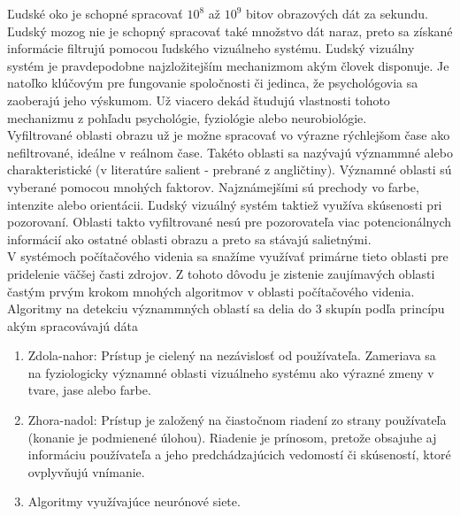 
Ľudské oko je schopné spracovať \begin{math}10^8\end{math} až \begin{math}10^9\end{math} bitov obrazových dát za sekundu.
Ľudský mozog nie je schopný spracovať také množstvo dát naraz, preto sa získané informácie filtrujú pomocou ľudského vizuálneho systému\cite{Fmph-videnie}.
Ľudský vizuálny systém je pravdepodobne najzložitejším mechanizmom akým človek disponuje.
Je natoľko klúčovým pre fungovanie spoločnosti či jedinca, že psychológovia sa zaoberajú jeho výskumom.
Už viacero dekád študujú vlastnosti tohoto mechanizmu z pohľadu psychológie, fyziológie alebo neurobiológie.
\\
Vyfiltrované oblasti obrazu už je možne spracovať vo výrazne rýchlejšom čase ako nefiltrované, ideálne v reálnom čase.
Takéto oblasti sa nazývajú význammné alebo charakteristické (v literatúre salient - prebrané z angličtiny).
Významné oblasti sú vyberané pomocou mnohých faktorov.
Najznámejšími sú prechody vo farbe, intenzite alebo orientácii.
Ľudský vizuálný systém taktiež využíva skúsenosti pri pozorovaní.
Oblasti takto vyfiltrované nesú pre pozorovateľa viac potencionálnych informácií ako ostatné oblasti obrazu a preto sa stávajú salietnými.
\\
V systémoch počítačového videnia sa snažíme využívať primárne tieto oblasti pre pridelenie väčšej časti zdrojov.
Z tohoto dôvodu je zistenie zaujímavých oblasti častým prvým krokom mnohých algoritmov v oblasti počítačového videnia.
\\
Algoritmy na detekciu význammných oblastí sa delia do 3 skupín podľa princípu akým spracovávajú dáta\cite{brief-survey}

  \begin{enumerate}
          \item Zdola-nahor: Prístup je cielený na nezávislosť od používateľa.
          Zameriava sa na fyziologicky významné oblasti vizuálneho systému ako výrazné zmeny v tvare, jase alebo farbe.
          \item Zhora-nadol: Prístup je založený na čiastočnom riadení zo strany používateľa (konanie je podmienené úlohou).
          Riadenie je prínosom, pretože obsajuhe aj informáciu používateľa a jeho predchádzajúcich vedomostí či skúseností, ktoré ovplyvňujú vnímanie.
          \item Algoritmy využívajúce neurónové siete.
  \end{enumerate}

